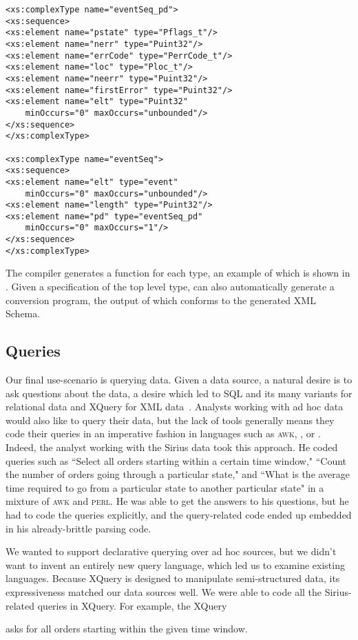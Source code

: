 \documentclass[times]{acm-sigplan}
\newcommand{\dibbler}{Sirius}
\begin{document}
\begin{small}
\begin{verbatim}
<xs:complexType name="eventSeq_pd">
<xs:sequence>
<xs:element name="pstate" type="Pflags_t"/>
<xs:element name="nerr" type="Puint32"/>
<xs:element name="errCode" type="PerrCode_t"/>
<xs:element name="loc" type="Ploc_t"/>
<xs:element name="neerr" type="Puint32"/>
<xs:element name="firstError" type="Puint32"/>
<xs:element name="elt" type="Puint32" 
    minOccurs="0" maxOccurs="unbounded"/>
</xs:sequence>
</xs:complexType>

<xs:complexType name="eventSeq">
<xs:sequence>
<xs:element name="elt" type="event" 
    minOccurs="0" maxOccurs="unbounded"/>
<xs:element name="length" type="Puint32"/>
<xs:element name="pd" type="eventSeq_pd" 
    minOccurs="0" maxOccurs="1"/>
</xs:sequence>
</xs:complexType>
\end{verbatim} 
\end{small}
The \pads{} compiler generates a  function for each type, an example of which is shown in .  Given a specification of the top level type, \pads{} can also automatically generate a conversion program, the output of which conforms to the generated XML Schema.

\subsection{Queries}
Our final use-scenario is querying data.
Given a data source, a natural desire is to ask questions about the data, a desire which led to SQL and its many variants for relational data and XQuery for XML data~\cite{boag03XQueryDraft}.  Analysts working with ad hoc data would also like to query their
data, but the lack of tools generally means they code their queries in an imperative fashion in languages such as \textsc{awk}, \perl{}, or \C{}.
Indeed, the analyst working with the \dibbler{} data took this approach.
He coded queries such as ``Select all orders starting within a certain time window," ``Count the number of orders going through a particular state," and ``What is the average time required to go from a particular state to another
particular state" in a mixture of \textsc{awk} and \textsc{perl}.  He was
able to get the answers to his questions, but he had to code the queries explicitly, and the query-related code ended up embedded in his already-brittle parsing code.

We wanted to support declarative querying over ad hoc sources, but we didn't want to invent an entirely new query language, which led us to examine existing languages.  Because XQuery is designed to manipulate semi-structured data, its expressiveness matched our data sources well.  We were able to code all the \dibbler{}-related queries in XQuery.  For example, the XQuery
\begin{code}
\end{code}
asks for all orders starting within the given time window.  
\end{document}
